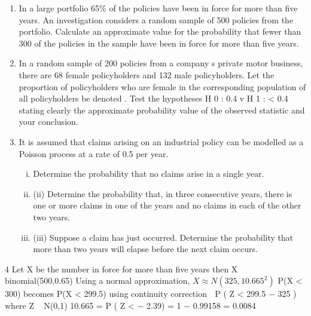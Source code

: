 \documentclass[a4paper,12pt]{article}
\begin{document}
\begin{enumerate}

\item In a large portfolio 65\% of the policies have been in force for more than five years.
An investigation considers a random sample of 500 policies from the portfolio.
Calculate an approximate value for the probability that fewer than 300 of the policies
in the sample have been in force for more than five years.


\item In a random sample of 200 policies from a company s private motor business, there
are 68 female policyholders and 132 male policyholders.
Let the proportion of policyholders who are female in the corresponding population of
all policyholders be denoted .
Test the hypotheses
H 0 :
0.4 v H 1 :
< 0.4
stating clearly the approximate probability value of the observed statistic and your conclusion.
\item It is assumed that claims arising on an industrial policy can be modelled as a Poisson process at a rate of 0.5 per year.

\begin{enumerate}[(i)] 
\item Determine the probability that no claims arise in a single year.
\item (ii) Determine the probability that, in three consecutive years, there is one or more claims in one of the years and no claims in each of the other two years.

\item (iii) Suppose a claim has just occurred. Determine the probability that more than two years will elapse before the next claim occurs.
\end{enumerate}
\end{enumerate}
\newpage

4
Let X be the number in force for more than five years
then X ~ binomial(500,0.65)
Using a normal approximation, $X ≈ N(325, 10.665^2 )$
P(X < 300) becomes P(X < 299.5) using continuity correction
 P ( Z <
299.5 − 325
) where Z ~ N(0,1)
10.665
= P ( Z < − 2.39) = 1 − 0.99158 = 0.0084
\end{document}
